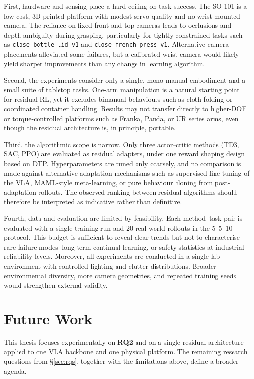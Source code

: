 First, hardware and sensing place a hard ceiling on task success. The SO-101 is a low-cost, 3D-printed platform with modest servo quality and no wrist-mounted camera. The reliance on fixed front and top cameras leads to occlusions and depth ambiguity during grasping, particularly for tightly constrained tasks such as \texttt{close-bottle-lid-v1} and \texttt{close-french-press-v1}. Alternative camera placements alleviated some failures, but a calibrated wrist camera would likely yield sharper improvements than any change in learning algorithm.

Second, the experiments consider only a single, mono-manual embodiment and a small suite of tabletop tasks. One-arm manipulation is a natural starting point for residual RL, yet it excludes bimanual behaviours such as cloth folding or coordinated container handling. Results may not transfer directly to higher-DOF or torque-controlled platforms such as Franka, Panda, or UR series arms, even though the residual architecture is, in principle, portable.

Third, the algorithmic scope is narrow. Only three actor–critic methods (TD3, SAC, PPO) are evaluated as residual adapters, under one reward shaping design based on DTP. Hyperparameters are tuned only coarsely, and no comparison is made against alternative adaptation mechanisms such as supervised fine-tuning of the VLA, MAML-style meta-learning, or pure behaviour cloning from post-adaptation rollouts. The observed ranking between residual algorithms should therefore be interpreted as indicative rather than definitive.

Fourth, data and evaluation are limited by feasibility. Each method–task pair is evaluated with a single training run and 20 real-world rollouts in the 5–5–10 protocol. This budget is sufficient to reveal clear trends but not to characterise rare failure modes, long-term continual learning, or safety statistics at industrial reliability levels. Moreover, all experiments are conducted in a single lab environment with controlled lighting and clutter distributions. Broader environmental diversity, more camera geometries, and repeated training seeds would strengthen external validity.


\section{Future Work}

This thesis focuses experimentally on \textbf{RQ2} and on a single residual architecture applied to one VLA backbone and one physical platform. The remaining research questions from \S\ref{sec:rqs}, together with the limitations above, define a broader agenda.

